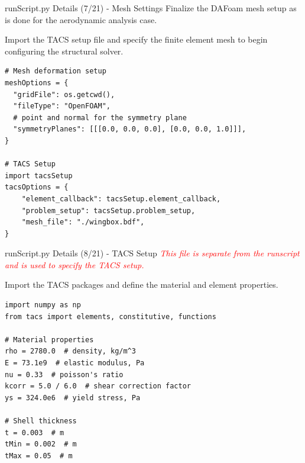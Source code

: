 \documentclass{bredelebeamer}
\begin{document}
\begin{frame}[fragile]{runScript.py Details (7/21) - \large Mesh Settings}
Finalize the DAFoam mesh setup as is done for the aerodynamic analysis case.

\vspace{0.25cm}

Import the TACS setup file and specify the finite element mesh to begin configuring the structural solver.
\scriptsize
\lstset{ language=bash }
\begin{lstlisting}
# Mesh deformation setup
meshOptions = {
  "gridFile": os.getcwd(),
  "fileType": "OpenFOAM",
  # point and normal for the symmetry plane
  "symmetryPlanes": [[[0.0, 0.0, 0.0], [0.0, 0.0, 1.0]]],
}

# TACS Setup
import tacsSetup
tacsOptions = {
    "element_callback": tacsSetup.element_callback,
    "problem_setup": tacsSetup.problem_setup,
    "mesh_file": "./wingbox.bdf",
}
\end{lstlisting}
\normalsize
\end{frame}

\begin{frame}[fragile]{runScript.py Details (8/21) - \large TACS Setup}
\textcolor{red}{\textit{This file is separate from the runscript and is used to specify the TACS setup.}}

\vspace{0.25cm}

Import the TACS packages and define the material and element properties.

\scriptsize
\lstset{ language=bash }
\begin{lstlisting}
import numpy as np
from tacs import elements, constitutive, functions

# Material properties
rho = 2780.0  # density, kg/m^3
E = 73.1e9  # elastic modulus, Pa
nu = 0.33  # poisson's ratio
kcorr = 5.0 / 6.0  # shear correction factor
ys = 324.0e6  # yield stress, Pa

# Shell thickness
t = 0.003  # m
tMin = 0.002  # m
tMax = 0.05  # m
\end{lstlisting}
\normalsize
\end{frame}
\end{document}
